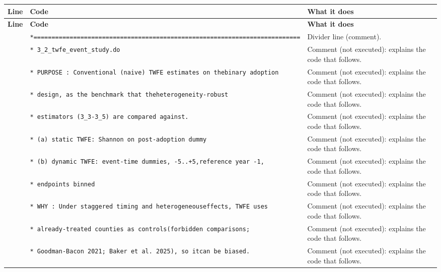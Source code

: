 \documentclass[10pt]{article}
\newcommand{\codetable}[1]{%
{\footnotesize
\begin{longtable}{>{\raggedleft\arraybackslash}p{0.55cm}>{\raggedright\arraybackslash}p{8.3cm}>{\raggedright\arraybackslash}p{8.0cm}}
\toprule \textbf{Line} & \textbf{Code} & \textbf{What it does}\\ \midrule \endfirsthead
\toprule \textbf{Line} & \textbf{Code} & \textbf{What it does}\\ \midrule \endhead
\bottomrule \endfoot
#1
\end{longtable}}}
\begin{document}
\codetable{1 & \texttt{*=========================================================\newline \hspace*{1em}=================} & Divider line (comment).\\
2 & \texttt{* 3\_2\_twfe\_event\_study.do} & Comment (not executed): explains the code that follows.\\
3 & \texttt{* PURPOSE : Conventional (\textquotedbl{}naive\textquotedbl{}) TWFE estimates on the\newline \hspace*{1em}binary adoption} & Comment (not executed): explains the code that follows.\\
4 & \texttt{*           design, as the benchmark that the\newline \hspace*{1em}heterogeneity-{}robust} & Comment (not executed): explains the code that follows.\\
5 & \texttt{*           estimators (3\_3-{}3\_5) are compared against.} & Comment (not executed): explains the code that follows.\\
6 & \texttt{*   (a) static TWFE:   Shannon on post-{}adoption dummy} & Comment (not executed): explains the code that follows.\\
7 & \texttt{*   (b) dynamic TWFE:  event-{}time dummies, -{}5..+5,\newline \hspace*{1em}reference year -{}1,} & Comment (not executed): explains the code that follows.\\
8 & \texttt{*                      endpoints binned} & Comment (not executed): explains the code that follows.\\
9 & \texttt{* WHY     : Under staggered timing and heterogeneous\newline \hspace*{1em}effects, TWFE uses} & Comment (not executed): explains the code that follows.\\
10 & \texttt{*           already-{}treated counties as controls\newline \hspace*{1em}(\textquotedbl{}forbidden comparisons\textquotedbl{};} & Comment (not executed): explains the code that follows.\\
11 & \texttt{*           Goodman-{}Bacon 2021; Baker et al. 2025), so it\newline \hspace*{1em}can be biased.} & Comment (not executed): explains the code that follows.\\
}
\end{document}
